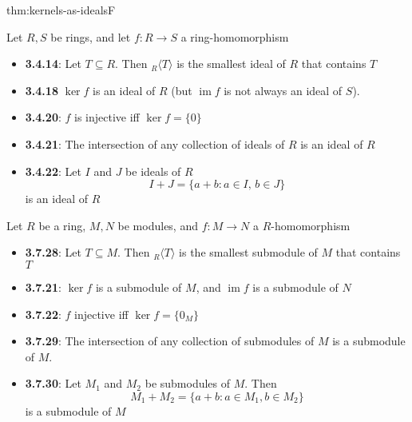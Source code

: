 \documentclass[landscape, 8pt]{extarticle}
\DeclareMathOperator{\im}{im}
\begin{document}
\begin{multicols}{3}
\begin{thm}{thm:kernels-as-ideals}{F}
    \vspace{-17pt}
    \setlength{\columnseprule}{0.5pt}
    \begin{multicols}{2}
        Let $R, S$ be rings, and let $f: R\to S$ a ring-homomorphism


        \begin{itemize}[leftmargin=-2pt]
            \item[] \textbf{3.4.14}: Let $T\subseteq R$. Then ${}_{R}\langle T \rangle$ is the smallest ideal of $R$ that contains $T$
            \item[] \textbf{3.4.18} $\ker f$ is an ideal of $R$ (but $\im f$ is not always an ideal of $S$).
            \item[] \textbf{3.4.20}: $f$ is injective iff $\ker f = \{0\}$
            \item[] \textbf{3.4.21}: The intersection of any collection of ideals of $R$ is an ideal of $R$
            \item[] \textbf{3.4.22}: Let $I$ and $J$ be ideals of $R$
            \[I + J = \{a + b : a\in I,\, b\in J\}\]
            is an ideal of $R$
        \end{itemize}
    
        \columnbreak


        Let $R$ be a ring, $M, N$ be modules, and $f: M\to N$ a $R$-homomorphism
        \begin{itemize}[leftmargin=-2pt]

            \item[] \textbf{3.7.28}: Let $T \subseteq M$. Then ${}_{R}\langle T \rangle$ is the smallest submodule of $M$ that contains $T$
            \item[] \textbf{3.7.21}: $\ker f$ is a submodule of $M$, and $\im f$ is a submodule of $N$
            \item[] \textbf{3.7.22}: $f$ injective iff $\ker f = \{0_{M}\}$
            \item[] \textbf{3.7.29}: The intersection of any collection of submodules of $M$ is a submodule of $M$.
            \item[] \textbf{3.7.30}: Let $M_{1}$ and $M_{2}$ be submodules of $M$. Then
            \[M_{1} + M_{2} = \{a + b : a\in M_{1}, b\in M_{2}\}\]
            is a submodule of $M$
        \end{itemize}
    \end{multicols}

    \vspace{-10pt}
\end{thm}


\end{multicols}
\end{document}

